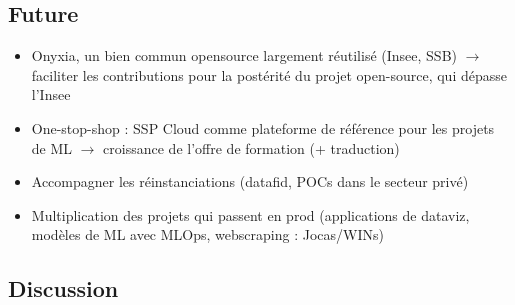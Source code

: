 \subsection{Future}

\begin{itemize}
    \item Onyxia, un bien commun opensource largement réutilisé (Insee, SSB) $\rightarrow$ faciliter les contributions pour la postérité du projet open-source, qui dépasse l'Insee
    \item One-stop-shop : SSP Cloud comme plateforme de référence pour les projets de ML $\rightarrow$ croissance de l'offre de formation (+ traduction)
    \item Accompagner les réinstanciations (datafid, POCs dans le secteur privé)
    \item Multiplication des projets qui passent en prod (applications de dataviz, modèles de ML avec MLOps, webscraping : Jocas/WINs)
\end{itemize}

\subsection{Discussion}

